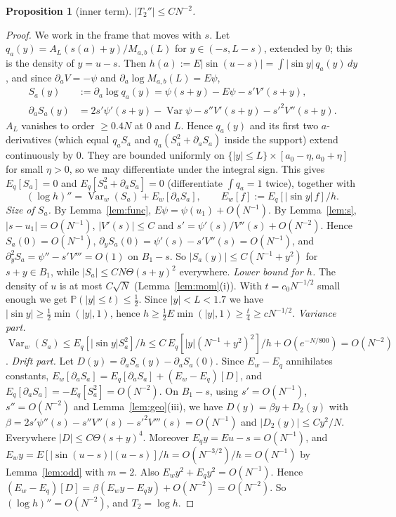 \documentclass[11pt]{amsart}
\newtheorem{proposition}[theorem]{Proposition}
\theoremstyle{definition}
\begin{document}
\begin{proposition}[inner term]\label{prop:T2}
$|T_2''|\le CN^{-2}$.
\end{proposition}
\begin{proof}
We work in the frame that moves with $s$. Let $q_a(y)=A_L(s(a)+y)/M_{a,b}(L)$ for $y\in(-s,L-s)$, extended by $0$; this is the density of $y=u-s$.
Then $h(a):=E|\sin(u-s)|=\int|\sin y|\,q_a(y)\,dy$, and since $\partial_aV=-\psi$ and $\partial_a\log M_{a,b}(L)=E\psi$,
\begin{align*}
S_a(y)&:=\partial_a\log q_a(y)=\psi(s+y)-E\psi-s'V'(s+y),\\
\partial_aS_a(y)&=2s'\psi'(s+y)-\operatorname{Var}\psi-s''V'(s+y)-s'^2V''(s+y).
\end{align*}
$A_L$ vanishes to order $\ge0.4N$ at $0$ and $L$. Hence $q_a(y)$ and its first two $a$-derivatives (which equal $q_aS_a$ and
$q_a(S_a^2+\partial_aS_a)$ inside the support) extend continuously by $0$. They are bounded uniformly on $\{|y|\le L\}\times[a_0-\eta,a_0+\eta]$ for
small $\eta>0$, so we may differentiate under the integral sign. This gives
$E_q[S_a]=0$ and $E_q[S_a^2+\partial_aS_a]=0$ (differentiate $\int q_a=1$ twice), together with
\[
(\log h)''=\operatorname{Var}_w(S_a)+E_w[\partial_aS_a],\qquad E_w[f]:=E_q[|\sin y|\,f]/h .
\]
\emph{Size of $S_a$.} By Lemma~\ref{lem:func}, $E\psi=\psi(u_1)+O(N^{-1})$. By Lemma~\ref{lem:s}, $|s-u_1|=O(N^{-1})$, $|V'(s)|\le C$ and
$s'=\psi'(s)/V''(s)+O(N^{-2})$. Hence $S_a(0)=O(N^{-1})$, $\partial_yS_a(0)=\psi'(s)-s'V''(s)=O(N^{-1})$, and
$\partial_y^2S_a=\psi''-s'V'''=O(1)$ on $B_1-s$. So $|S_a(y)|\le C(N^{-1}+y^2)$ for $s+y\in B_1$, while $|S_a|\le CN\Theta(s+y)^2$ everywhere.
\emph{Lower bound for $h$.} The density of $u$ is at most $C\sqrt N$ (Lemma~\ref{lem:mom}(i)). With $t=c_0N^{-1/2}$ small enough we get $\mathbb P(|y|\le t)\le\frac12$.
Since $|y|<L<1.7$ we have $|\sin y|\ge\frac12\min(|y|,1)$, hence $h\ge\frac12E\min(|y|,1)\ge\frac t4\ge cN^{-1/2}$.
\emph{Variance part.} $\operatorname{Var}_w(S_a)\le E_q[|\sin y|S_a^2]/h\le C\,E_q[|y|(N^{-1}+y^2)^2]/h+O(e^{-N/800})=O(N^{-2})$.
\emph{Drift part.} Let $D(y)=\partial_aS_a(y)-\partial_aS_a(0)$. Since $E_w-E_q$ annihilates constants,
$E_w[\partial_aS_a]=E_q[\partial_aS_a]+(E_w-E_q)[D]$, and $E_q[\partial_aS_a]=-E_q[S_a^2]=O(N^{-2})$. On $B_1-s$, using $s'=O(N^{-1})$,
$s''=O(N^{-2})$ and Lemma~\ref{lem:geo}(iii), we have $D(y)=\beta y+D_2(y)$ with $\beta=2s'\psi''(s)-s''V''(s)-s'^2V'''(s)=O(N^{-1})$ and $|D_2(y)|\le Cy^2/N$.
Everywhere $|D|\le C\Theta(s+y)^4$. Moreover $E_qy=Eu-s=O(N^{-1})$, and $E_wy=E[|\sin(u-s)|(u-s)]/h=O(N^{-3/2})/h=O(N^{-1})$ by
Lemma~\ref{lem:odd} with $m=2$. Also $E_wy^2+E_qy^2=O(N^{-1})$. Hence $(E_w-E_q)[D]=\beta(E_wy-E_qy)+O(N^{-2})=O(N^{-2})$.
So $(\log h)''=O(N^{-2})$, and $T_2=\log h$.
\end{proof}
\end{document}
